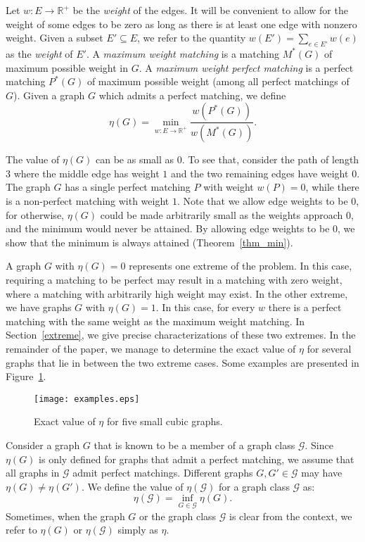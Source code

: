 \documentclass{article}
\newcommand{\RE}{\mathbb{R}}			\newcommand{\ZZ}{\mathbb{Z}}			\newcommand{\OO}{\widetilde{O}}
\newcommand{\GG}{\mathcal{G}}
\begin{document}
Let $w : E \rightarrow \RE^+$ be the \emph{weight} of the edges. It will be convenient to allow for the weight of some edges to be zero as long as there is at least one edge with nonzero weight. Given a subset $E' \subseteq E$, we refer to the quantity $w(E') = \sum_{e \in E'} w(e)$ as the \emph{weight} of $E'$. A \emph{maximum weight matching} is a matching $M^*(G)$ of maximum possible weight in $G$. A \emph{maximum weight perfect matching} is a perfect matching $P^*(G)$ of maximum possible weight (among all perfect matchings of $G$). Given a graph $G$ which admits a perfect matching, we define
$$\eta(G) =  \min_{w:E\rightarrow \RE^+} \frac{w(P^*(G))}{w(M^*(G))}.$$

The value of $\eta(G)$ can be as small as $0$. To see that, consider the path of length $3$ where the middle edge has weight $1$ and the two remaining edges have weight $0$.  The graph $G$ has a single perfect matching $P$ with weight $w(P)=0$, while there is a non-perfect matching with weight $1$. Note that we allow edge weights to be $0$, for otherwise, $\eta(G)$ could be made arbitrarily small as the weights approach $0$, and the minimum would never be attained. By allowing edge weights to be $0$, we show that the minimum is always attained (Theorem~\ref{thm_min}).

A graph $G$ with $\eta(G)=0$ represents one extreme of the problem. In this case, requiring a matching to be perfect may result in a matching with zero weight, where a matching with arbitrarily high weight may exist. In the other extreme, we have graphs $G$ with $\eta(G) = 1$. In this case, for every $w$ there is a perfect matching with the same weight as the maximum weight matching. In Section~\ref{extreme}, we give precise characterizations of these two extremes. In the remainder of the paper, we manage to determine the exact value of $\eta$ for several graphs that lie in between the two extreme cases. Some examples are presented in Figure~\ref{fig:examples}.

\begin{figure}[t]
\centering
\texttt{[image: examples.eps]}
\caption{Exact value of $\eta$ for five small cubic graphs.}
\label{fig:examples}
\end{figure}

Consider a graph $G$ that is known to be a member of a graph class $\GG$. Since $\eta(G)$ is only defined for graphs that admit a perfect matching, we assume that all graphs in $\GG$ admit perfect matchings. Different graphs $G,G' \in \GG$ may have $\eta(G) \neq \eta(G')$. We define the value of $\eta(\GG)$ for a graph class $\GG$ as:
$$\eta(\GG) = \inf_{G \in \GG} \eta(G).$$
Sometimes, when the graph $G$ or the graph class $\GG$ is clear from the context, we refer to $\eta(G)$ or $\eta(\GG)$ simply as $\eta$.
\end{document}
